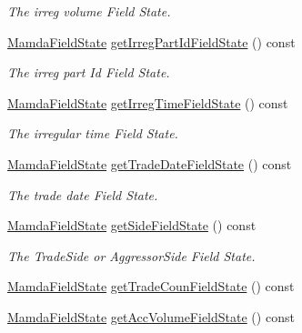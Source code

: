 \begin{CompactItemize}
\begin{CompactList}\small\item\em The irreg volume Field State. \item\end{CompactList}\item 
\hyperlink{namespaceWombat_93aac974f2ab713554fd12a1fa3b7d2a}{Mamda\-Field\-State} \hyperlink{classWombat_1_1MamdaTradeListener_c0c46a4f597942f1256906de3aae3c4c}{get\-Irreg\-Part\-Id\-Field\-State} () const 
\begin{CompactList}\small\item\em The irreg part Id Field State. \item\end{CompactList}\item 
\hyperlink{namespaceWombat_93aac974f2ab713554fd12a1fa3b7d2a}{Mamda\-Field\-State} \hyperlink{classWombat_1_1MamdaTradeListener_c5bf736fa985c2ee23694b11235e5933}{get\-Irreg\-Time\-Field\-State} () const 
\begin{CompactList}\small\item\em The irregular time Field State. \item\end{CompactList}\item 
\hyperlink{namespaceWombat_93aac974f2ab713554fd12a1fa3b7d2a}{Mamda\-Field\-State} \hyperlink{classWombat_1_1MamdaTradeListener_6ce7a7bba0ea6365f5e5fa3901ae7701}{get\-Trade\-Date\-Field\-State} () const 
\begin{CompactList}\small\item\em The trade date Field State. \item\end{CompactList}\item 
\hyperlink{namespaceWombat_93aac974f2ab713554fd12a1fa3b7d2a}{Mamda\-Field\-State} \hyperlink{classWombat_1_1MamdaTradeListener_9943001740bebfecd4801267dac6daca}{get\-Side\-Field\-State} () const 
\begin{CompactList}\small\item\em The Trade\-Side or Aggressor\-Side Field State. \item\end{CompactList}\item 
\hyperlink{namespaceWombat_93aac974f2ab713554fd12a1fa3b7d2a}{Mamda\-Field\-State} \hyperlink{classWombat_1_1MamdaTradeListener_0df0c59d4528d53d2d69e84ed9477ae7}{get\-Trade\-Coun\-Field\-State} () const 
\item 
\hyperlink{namespaceWombat_93aac974f2ab713554fd12a1fa3b7d2a}{Mamda\-Field\-State} \hyperlink{classWombat_1_1MamdaTradeListener_48419d9b8e7c932ea3ee9750f2619d2d}{get\-Acc\-Volume\-Field\-State} () const 

\end{CompactItemize}

